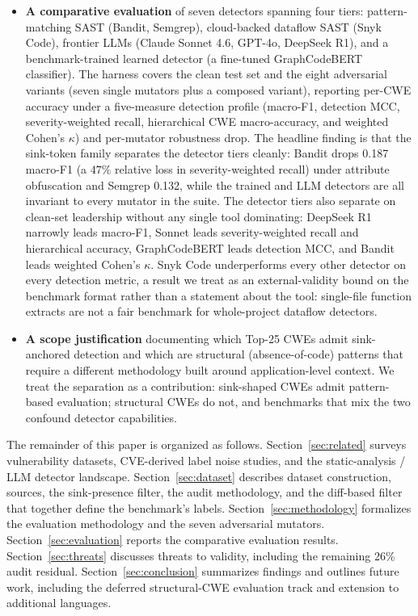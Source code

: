 \begin{itemize}
  \item \textbf{A comparative evaluation} of seven detectors spanning
    four tiers: pattern-matching SAST (Bandit, Semgrep), cloud-backed
    dataflow SAST (Snyk Code), frontier LLMs (Claude Sonnet 4.6,
    GPT-4o, DeepSeek R1), and a benchmark-trained learned detector
    (a fine-tuned GraphCodeBERT classifier). The harness covers the
    clean test set and the eight adversarial variants (seven single
    mutators plus a composed variant), reporting per-CWE accuracy
    under a five-measure detection profile (macro-F1, detection MCC,
    severity-weighted recall, hierarchical CWE macro-accuracy, and
    weighted Cohen's $\kappa$) and per-mutator robustness drop. The
    headline finding is that the sink-token family separates the
    detector tiers cleanly: Bandit drops 0.187 macro-F1 (a $47\%$
    relative loss in severity-weighted recall) under attribute
    obfuscation and Semgrep 0.132, while the trained and LLM detectors
    are all invariant to every mutator in the suite. The detector
    tiers also separate on clean-set leadership without any single
    tool dominating: DeepSeek R1 narrowly leads macro-F1, Sonnet
    leads severity-weighted recall and hierarchical accuracy,
    GraphCodeBERT leads detection MCC, and Bandit leads weighted
    Cohen's $\kappa$. Snyk Code underperforms every other detector
    on every detection metric, a result we treat as an
    external-validity bound on the benchmark format rather than a
    statement about the tool: single-file function extracts are not
    a fair benchmark for whole-project dataflow detectors.

  \item \textbf{A scope justification} documenting which Top-25 CWEs
    admit sink-anchored detection and which are structural
    (absence-of-code) patterns that require a different methodology
    built around application-level context. We treat the separation
    as a contribution: sink-shaped CWEs admit pattern-based
    evaluation; structural CWEs do not, and benchmarks that mix the
    two confound detector capabilities.
\end{itemize}

The remainder of this paper is organized as follows.
Section~\ref{sec:related} surveys vulnerability datasets, CVE-derived
label noise studies, and the static-analysis / LLM detector landscape.
Section~\ref{sec:dataset} describes dataset construction, sources, the
sink-presence filter, the audit methodology, and the diff-based filter
that together define the benchmark's labels.
Section~\ref{sec:methodology} formalizes the evaluation methodology and
the seven adversarial mutators.
Section~\ref{sec:evaluation} reports the comparative evaluation
results.
Section~\ref{sec:threats} discusses threats to validity, including the
remaining 26\% audit residual.
Section~\ref{sec:conclusion} summarizes findings and outlines future
work, including the deferred structural-CWE evaluation track and
extension to additional languages.
